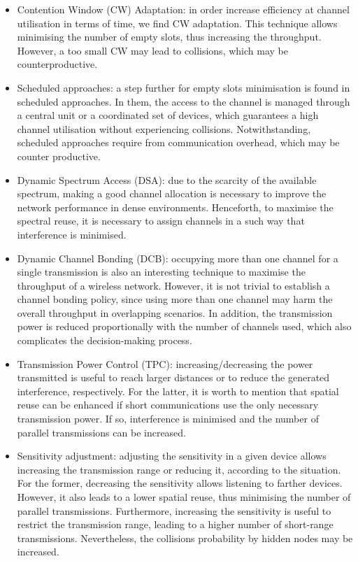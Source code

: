 \documentclass[12pt, a4paper,twoside]{tesi_upf}
\begin{document}
			\begin{itemize}
				\item Contention Window (CW) Adaptation: in order increase efficiency at channel utilisation in terms of time, we find CW adaptation. This technique allows minimising the number of empty slots, thus increasing the throughput. However, a too small CW may lead to collisions, which may be counterproductive.
				\item Scheduled approaches: a step further for empty slots minimisation is found in scheduled approaches. In them, the access to the channel is managed through a central unit or a coordinated set of devices, which guarantees a high channel utilisation without experiencing collisions. Notwithstanding, scheduled approaches require from communication overhead, which may be counter productive.
				\item Dynamic Spectrum Access (DSA): due to the scarcity of the available spectrum, making a good channel allocation is necessary to improve the network performance in dense environments. Henceforth, to maximise the spectral reuse, it is necessary to assign channels in a such way that interference is minimised.
				\item Dynamic Channel Bonding (DCB): occupying more than one channel for a single transmission is also an interesting technique to maximise the throughput of a wireless network. However, it is not trivial to establish a channel bonding policy, since using more than one channel may harm the overall throughput in overlapping scenarios. In addition, the transmission power is reduced proportionally with the number of channels used, which also complicates the decision-making process.
				\item Transmission Power Control (TPC): increasing/decreasing the power transmitted is useful to reach larger distances or to reduce the generated interference, respectively. For the latter, it is worth to mention that spatial reuse can be enhanced if short communications use the only necessary transmission power. If so, interference is minimised and the number of parallel transmissions can be increased.
				\item Sensitivity adjustment: adjusting the sensitivity in a given device allows increasing the transmission range or reducing it, according to the situation. For the former, decreasing the sensitivity allows listening to farther devices. However, it also leads to a lower spatial reuse, thus minimising the number of parallel transmissions. Furthermore, increasing the sensitivity is useful to restrict the transmission range, leading to a higher number of short-range transmissions. Nevertheless, the collisions probability by hidden nodes may be increased.

\end{itemize}
\end{document}
